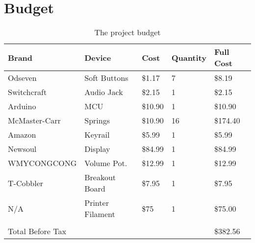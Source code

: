 \section{Budget}
\begin{table}[h!]
  \centering
  \begin{tabular}{|l|l|l|l|l|}
    \hline
    Brand            & Device           & Cost    & Quantity & Full Cost \\ \hline
    Odseven          & Soft Buttons     & \$1.17  & 7        & \$8.19    \\ \hline
    Switchcraft      & Audio Jack       & \$2.15  & 1        & \$2.15    \\ \hline
    Arduino          & MCU              & \$10.90 & 1        & \$10.90   \\ \hline
    McMaster-Carr    & Springs          & \$10.90 & 16       & \$174.40  \\ \hline
    Amazon           & Keyrail          & \$5.99  & 1        & \$5.99    \\ \hline
    Newsoul          & Display          & \$84.99 & 1        & \$84.99   \\ \hline
    WMYCONGCONG      & Volume Pot.      & \$12.99 & 1        & \$12.99   \\ \hline
    T-Cobbler        & Breakout Board   & \$7.95  & 1        & \$7.95    \\ \hline
    N/A              & Printer Filament & \$75    & 1        & \$75.00   \\ \hline
                     &                  &         &          &           \\ \hline
    Total Before Tax &                  &         &          & \$382.56  \\ \hline
  \end{tabular}
  \caption{The project budget}
  \label{Tab:budget}
\end{table}
